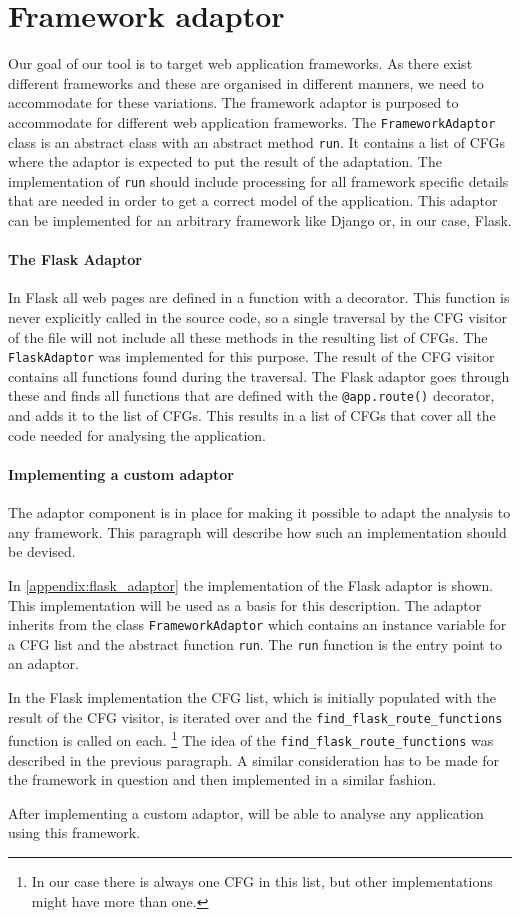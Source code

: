 \section{Framework adaptor}\label{framework_adaptor}
Our goal of our tool is to target web application frameworks.
As there exist different frameworks and these are organised in different manners, we need to accommodate for these variations.
The framework adaptor is purposed to accommodate for different web application frameworks.
The \texttt{FrameworkAdaptor} class is an abstract class with an abstract method \texttt{run}.
It contains a list of CFGs where the adaptor is expected to put the result of the adaptation.
The implementation of \texttt{run} should include processing for all framework specific details that are needed in order to get a correct model of the application.
This adaptor can be implemented for an arbitrary framework like Django or, in our case, Flask.

\paragraph{The Flask Adaptor}
In Flask all web pages are defined in a function with a decorator.
This function is never explicitly called in the source code, so a single traversal by the CFG visitor of the file will not include all these methods in the resulting list of CFGs.
The \texttt{FlaskAdaptor} was implemented for this purpose.
The result of the CFG visitor contains all functions found during the traversal.
The Flask adaptor goes through these and finds all functions that are defined with the \texttt{@app.route()} decorator, and adds it to the list of CFGs.
This results in a list of CFGs that cover all the code needed for analysing the application.

\paragraph{Implementing a custom adaptor}
The adaptor component is in place for making it possible to adapt the analysis to any framework.
This paragraph will describe how such an implementation should be devised.

In \cref{appendix:flask_adaptor} the implementation of the Flask adaptor is shown.
This implementation will be used as a basis for this description.
The adaptor inherits from the class \texttt{FrameworkAdaptor} which contains an instance variable for a CFG list and the abstract function \texttt{run}.
The \texttt{run} function is the entry point to an adaptor.

In the Flask implementation the CFG list, which is initially populated with the result of the CFG visitor, is iterated over and the \texttt{find\_flask\_route\_functions} function is called on each. \footnote{In our case there is always one CFG in this list, but other implementations might have more than one.}
The idea of the \texttt{find\_flask\_route\_functions} was described in the previous paragraph.
A similar consideration has to be made for the framework in question and then implemented in a similar fashion.

After implementing a custom adaptor, \pyt{} will be able to analyse any application using this framework.
  

